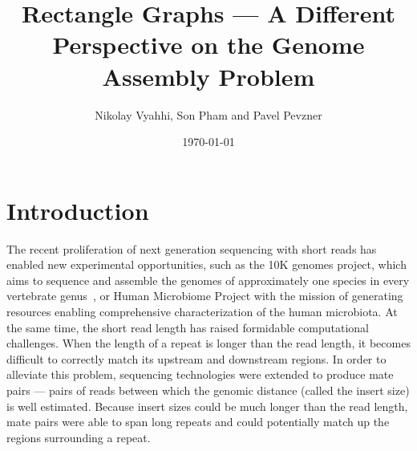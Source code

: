 \documentclass[a4paper]{article}
\begin{document}
\title{Rectangle Graphs --- A Different Perspective on the Genome Assembly Problem}
\author{Nikolay Vyahhi, Son Pham and Pavel Pevzner}
\date{\today}
\maketitle


\newpage
\section{Introduction}

The recent proliferation of next generation sequencing with short reads has enabled 
new experimental opportunities, such as the 10K genomes project, which
aims to sequence and assemble the genomes of approximately one species in every
vertebrate genus~\cite{Haussler09}, or Human Microbiome Project with  
the mission of generating resources enabling comprehensive characterization of the human microbiota. 
At the same time, the short read length has raised formidable computational challenges. 
When the length of a repeat is longer than the read length, it becomes difficult to
correctly match its upstream and downstream regions. In order to alleviate this
problem, sequencing technologies were extended to produce mate pairs —
pairs of reads between which the genomic distance (called the insert size) is well
estimated. Because insert sizes could be much longer than the read length, mate
pairs were able to span long repeats and could potentially match up the regions
surrounding a repeat.
\end{document}
